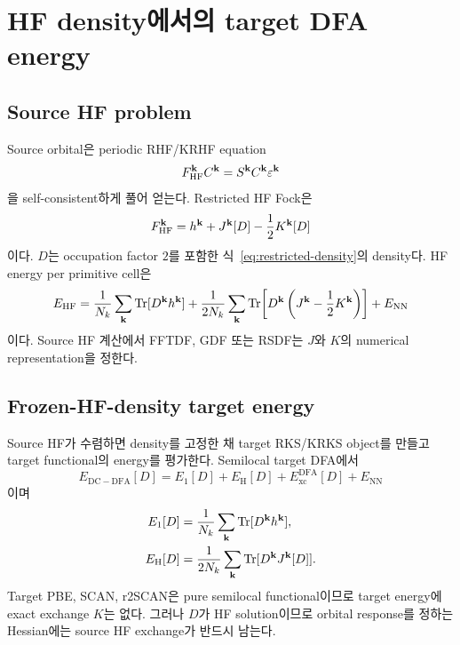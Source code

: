 \section{HF density에서의 target DFA energy}
\label{sec:fixed-density-energy}

\subsection{Source HF problem}

Source orbital은 periodic RHF/KRHF equation
\begin{equation}
  F_{\mathrm{HF}}^{\mathbf{k}}C^{\mathbf{k}}
  =S^{\mathbf{k}}C^{\mathbf{k}}\varepsilon^{\mathbf{k}}
  \label{eq:hf-roothaan}
\end{equation}
을 self-consistent하게 풀어 얻는다. Restricted HF Fock은
\begin{equation}
  F_{\mathrm{HF}}^{\mathbf{k}}
  =h^{\mathbf{k}}+J^{\mathbf{k}}[D]-\frac12K^{\mathbf{k}}[D]
  \label{eq:hf-fock}
\end{equation}
이다. $D$는 occupation factor $2$를 포함한 식~\eqref{eq:restricted-density}의 density다.
HF energy per primitive cell은
\begin{equation}
  E_{\mathrm{HF}}
  =\frac{1}{N_k}\sum_{\mathbf{k}}\operatorname{Tr}[D^{\mathbf{k}}h^{\mathbf{k}}]
   +\frac{1}{2N_k}\sum_{\mathbf{k}}\operatorname{Tr}\!\left[
      D^{\mathbf{k}}\left(J^{\mathbf{k}}-\frac12K^{\mathbf{k}}\right)\right]
   +E_{\mathrm{NN}}
  \label{eq:hf-energy}
\end{equation}
이다. Source HF 계산에서 FFTDF, GDF 또는 RSDF는 $J$와 $K$의 numerical
representation을 정한다.

\subsection{Frozen-HF-density target energy}

Source HF가 수렴하면 density를 고정한 채 target RKS/KRKS object를 만들고 target
functional의 energy를 평가한다. Semilocal target DFA에서
\begin{equation}
  E_{\mathrm{DC-DFA}}[D]
  =E_1[D]+E_{\mathrm H}[D]+E_{\mathrm{xc}}^{\mathrm{DFA}}[D]
   +E_{\mathrm{NN}}
  \label{eq:dc-energy-components}
\end{equation}
이며
\begin{align}
  E_1[D]
  &=\frac{1}{N_k}\sum_{\mathbf{k}}\operatorname{Tr}[D^{\mathbf{k}}h^{\mathbf{k}}],
  \label{eq:dc-one-electron-energy}\\
  E_{\mathrm H}[D]
  &=\frac{1}{2N_k}\sum_{\mathbf{k}}\operatorname{Tr}[D^{\mathbf{k}}J^{\mathbf{k}}[D]].
  \label{eq:dc-hartree-energy}
\end{align}
Target PBE, SCAN, r2SCAN은 pure semilocal functional이므로 target energy에 exact
exchange $K$는 없다. 그러나 $D$가 HF solution이므로 orbital response를 정하는
Hessian에는 source HF exchange가 반드시 남는다.

